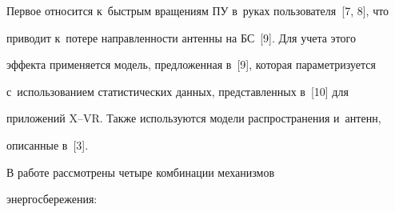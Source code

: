 Первое относится к~быстрым вращениям ПУ в~руках пользователя~[7, 8], что 


приводит к~потере направленности антенны на БС~[9]. Для учета этого 


эффекта применяется модель, предложенная в~[9], которая параметризуется 


с~использованием статистических данных, представленных в~[10] для 


приложений X--VR. Также используются модели распространения и~антенн, 


описанные в~[3].


     


     В работе рассмотрены четыре комбинации механизмов 


энергосбережения:


